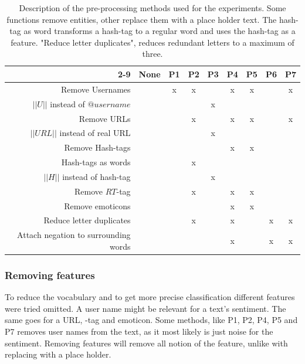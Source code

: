 \begin{table}[!htb]
	\centering
	\begin{tabular}{|r||c|c|c|c|c|c|c|c|}

		\cline{2-9}
	 \multicolumn{1}{c| }{ } & \textbf{None} & \textbf{P1} & \textbf{P2} & \textbf{P3} & \textbf{P4} & \textbf{P5} & \textbf{P6} & \textbf{P7}  \\ \hline
		Remove Usernames                     & & x & x &   & x & x & & x \\ \hline
		$||U||$ instead of $@username$       & &   &   & x &   &   & & \\ \hline
		Remove URLs                          & &   & x &   & x & x & & x \\ \hline
		$||URL||$ instead of real URL        & &   &   & x &   &   & & \\ \hline
		Remove Hash-tags                     & &   &   &   & x & x & & \\ \hline
		Hash-tags as words                   & &   & x &   &   &   & & \\ \hline
		$||H||$ instead of hash-tag          & &   &   & x &   &   & & \\ \hline
		Remove $RT$-tag                      & &   & x &   & x & x & & \\ \hline
		Remove emoticons                     & &   &   &   & x & x & & \\ \hline
		Reduce letter duplicates             & &   & x &   & x &   & x & x \\ \hline
		Attach negation to surrounding words & &   &   &   & x &   & x & x \\ \hline
	\end{tabular}
	\caption[Description of used pre-processing methods]{Description of the pre-processing methods used for the experiments. Some functions remove entities, other replace them with a place holder text. The hash-tag as word transforms a hash-tag to a regular word and uses the hash-tag as a feature. "Reduce letter duplicates", reduces redundant letters to a maximum of three.}
	\label{tab:preproc_desc}
\end{table}

\subsubsection{Removing features}
To reduce the vocabulary and to get more precise classification different features were tried omitted. A user name might be relevant for a text's sentiment. The same goes for a URL, -tag and emoticon. Some methods, like P1, P2, P4, P5 and P7 removes user names from the text, as it most likely is just noise for the sentiment. Removing features will remove all notion of the feature, unlike with replacing with a place holder.

